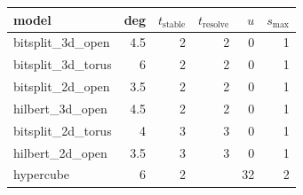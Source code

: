 \begin{tabular}{lrrrrr}%
\hline%
model&deg&$t_{\mathrm{stable}}$&$t_{\mathrm{resolve}}$&$u$&$s_{\max}$\\%
\hline%
bitsplit\_3d\_open&4.5&2&2&0&1\\%
bitsplit\_3d\_torus&6&2&2&0&1\\%
bitsplit\_2d\_open&3.5&2&2&0&1\\%
hilbert\_3d\_open&4.5&2&2&0&1\\%
bitsplit\_2d\_torus&4&3&3&0&1\\%
hilbert\_2d\_open&3.5&3&3&0&1\\%
hypercube&6&2&&32&2\\%
\hline%
\end{tabular}
